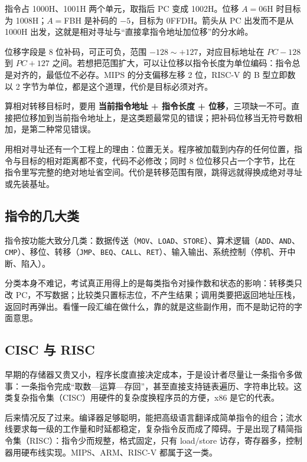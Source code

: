 指令占 1000H、1001H 两个单元，取指后 PC 变成 1002H。位移 $A=06$H 时目标为 1008H；$A=$FBH 是补码的 $-5$，目标为 0FFDH。箭头从 PC 出发而不是从 1000H 出发，这就是相对寻址与“直接拿指令地址加位移”的分水岭。

位移字段是 8 位补码，可正可负，范围 $-128\sim+127$，对应目标地址在 $PC-128$ 到 $PC+127$ 之间。若想把范围扩大，可以让位移以指令长度为单位编码：指令总是对齐的，最低位不必存。MIPS 的分支偏移左移 2 位，RISC-V 的 B 型立即数以 2 字节为单位，都是这个道理，代价是目标必须对齐。

\begin{attention}
算相对转移目标时，要用 \textbf{当前指令地址 + 指令长度 + 位移}，三项缺一不可。直接把位移加到当前指令地址上，是这类题最常见的错误；把补码位移当无符号数相加，是第二种常见错误。
\end{attention}

用相对寻址还有一个工程上的理由：位置无关。程序被加载到内存的任何位置，指令与目标的相对距离都不变，代码不必修改；同时 8 位位移只占一个字节，比在指令里写完整的绝对地址省空间。代价是转移范围有限，跳得远就得换成绝对寻址或先装基址。

\subsection{指令的几大类}

指令按功能大致分几类：数据传送（\texttt{MOV}、\texttt{LOAD}、\texttt{STORE}）、算术逻辑（\texttt{ADD}、\texttt{AND}、\texttt{CMP}）、移位、转移（\texttt{JMP}、\texttt{BEQ}、\texttt{CALL}、\texttt{RET}）、输入输出、系统控制（停机、开中断、陷入）。

分类本身不难记，考试真正用得上的是每类指令对操作数和状态的影响：转移类只改 PC，不写数据；比较类只置标志位，不产生结果；调用类要把返回地址压栈，返回时再弹出。看懂一段汇编在做什么，靠的就是这些副作用，而不是助记符的字面意思。

\subsection{CISC 与 RISC}

早期的存储器又贵又小，程序长度直接决定成本，于是设计者尽量让一条指令多做事：一条指令完成“取数—运算—存回”，甚至直接支持链表遍历、字符串比较。这类复杂指令集（CISC）用硬件的复杂度换程序员的方便，x86 是它的代表。

后来情况反了过来。编译器足够聪明，能把高级语言翻译成简单指令的组合；流水线要求每一级的工作量和时延都稳定，复杂指令反而成了障碍。于是出现了精简指令集（RISC）：指令少而规整，格式固定，只有 load/store 访存，寄存器多，控制器用硬布线实现。MIPS、ARM、RISC-V 都属于这一类。

